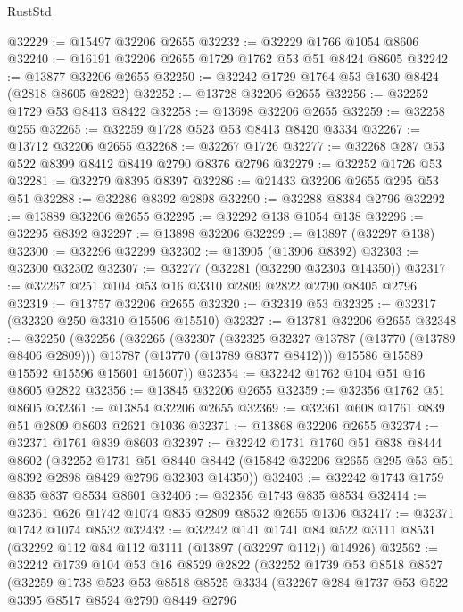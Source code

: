 \begin{lexlean}{RustStd}
\begin{coremodule}
@32229 := @15497 @32206 @2655
@32232 := @32229 @1766 @1054 @8606
@32240 := @16191 @32206 @2655 @1729 @1762 @53 @51 @8424 @8605
@32242 := @13877 @32206 @2655
@32250 := @32242 @1729 @1764 @53 @1630 @8424 (@2818 @8605 @2822)
@32252 := @13728 @32206 @2655
@32256 := @32252 @1729 @53 @8413 @8422
@32258 := @13698 @32206 @2655
@32259 := @32258 @255
@32265 := @32259 @1728 @523 @53 @8413 @8420 @3334
@32267 := @13712 @32206 @2655
@32268 := @32267 @1726
@32277 := @32268 @287 @53 @522 @8399 @8412 @8419 @2790 @8376 @2796
@32279 := @32252 @1726 @53
@32281 := @32279 @8395 @8397
@32286 := @21433 @32206 @2655 @295 @53 @51
@32288 := @32286 @8392 @2898
@32290 := @32288 @8384 @2796
@32292 := @13889 @32206 @2655
@32295 := @32292 @138 @1054 @138
@32296 := @32295 @8392
@32297 := @13898 @32206
@32299 := @13897 (@32297 @138)
@32300 := @32296 @32299
@32302 := @13905 (@13906 @8392)
@32303 := @32300 @32302
@32307 := @32277 (@32281 (@32290 @32303 @14350))
@32317 := @32267 @251 @104 @53 @16 @3310 @2809 @2822 @2790 @8405 @2796
@32319 := @13757 @32206 @2655
@32320 := @32319 @53
@32325 := @32317 (@32320 @250 @3310 @15506 @15510)
@32327 := @13781 @32206 @2655
@32348 := @32250
    (@32256
      (@32265
        (@32307
          (@32325 @32327 @13787 (@13770 (@13789 @8406 @2809)))
          @13787
          (@13770 (@13789 @8377 @8412)))
        @15586
        @15589
        @15592
        @15596
        @15601
        @15607))
@32354 := @32242 @1762 @104 @51 @16 @8605 @2822
@32356 := @13845 @32206 @2655
@32359 := @32356 @1762 @51 @8605
@32361 := @13854 @32206 @2655
@32369 := @32361 @608 @1761 @839 @51 @2809 @8603 @2621 @1036
@32371 := @13868 @32206 @2655
@32374 := @32371 @1761 @839 @8603
@32397 := @32242
    @1731
    @1760
    @51
    @838
    @8444
    @8602
    (@32252
      @1731
      @51
      @8440
      @8442
      (@15842 @32206 @2655 @295 @53 @51 @8392 @2898 @8429 @2796 @32303 @14350))
@32403 := @32242 @1743 @1759 @835 @837 @8534 @8601
@32406 := @32356 @1743 @835 @8534
@32414 := @32361 @626 @1742 @1074 @835 @2809 @8532 @2655 @1306
@32417 := @32371 @1742 @1074 @8532
@32432 := @32242
    @141
    @1741
    @84
    @522
    @3111
    @8531
    (@32292 @112 @84 @112 @3111 (@13897 (@32297 @112)) @14926)
@32562 := @32242
    @1739
    @104
    @53
    @16
    @8529
    @2822
    (@32252
      @1739
      @53
      @8518
      @8527
      (@32259
        @1738
        @523
        @53
        @8518
        @8525
        @3334
        (@32267
          @284
          @1737
          @53
          @522
          @3395
          @8517
          @8524
          @2790
          @8449
          @2796

\end{coremodule}
\end{lexlean}
